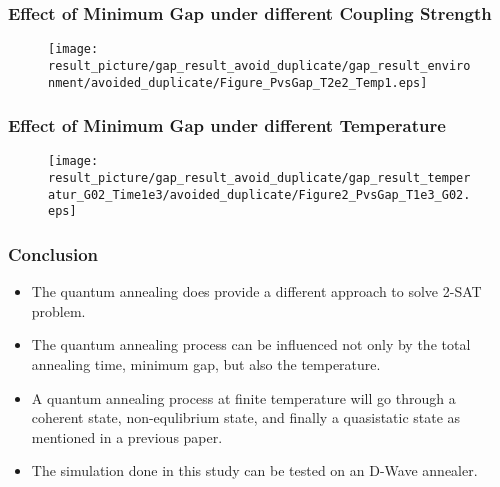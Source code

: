 \documentclass{beamer}
\begin{document}
\begin{frame}
	\frametitle{Effect of Minimum Gap under different Coupling Strength }

	\begin{figure}
		\centering
		\texttt{[image: result\_picture/gap\_result\_avoid\_duplicate/gap\_result\_environment/avoided\_duplicate/Figure\_PvsGap\_T2e2\_Temp1.eps]}
		
	\end{figure}
\end{frame}

\begin{frame}
	\frametitle{Effect of Minimum Gap under different Temperature }
	
	\begin{figure}
		\centering
		\texttt{[image: result\_picture/gap\_result\_avoid\_duplicate/gap\_result\_temperatur\_G02\_Time1e3/avoided\_duplicate/Figure2\_PvsGap\_T1e3\_G02.eps]}	
	\end{figure}
\end{frame}

\begin{frame}
	\frametitle{Conclusion}
	\begin{itemize}
		\item The quantum annealing does provide a different approach to solve 2-SAT problem.
		\item The quantum annealing process can be influenced not only by the total annealing time, minimum gap, but also the temperature.
		\item A quantum annealing process at finite temperature will go through a coherent state, non-equlibrium state, and finally a quasistatic state as mentioned in a previous paper.
		\item The simulation done in this study can be tested on an D-Wave annealer.
	\end{itemize}
\end{frame}
\end{document}
